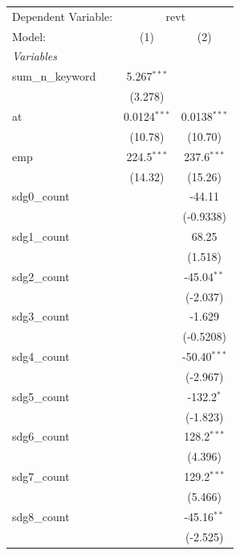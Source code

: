 
\begingroup
\centering
\begin{tabular}{lcc}
   \tabularnewline \midrule \midrule
   Dependent Variable: & \multicolumn{2}{c}{revt}\\
   Model:            & (1)            & (2)\\  
   \midrule
   \emph{Variables}\\
   sum\_n\_keyword   & 5.267$^{***}$  &   \\   
                     & (3.278)        &   \\   
   at                & 0.0124$^{***}$ & 0.0138$^{***}$\\   
                     & (10.78)        & (10.70)\\   
   emp               & 224.5$^{***}$  & 237.6$^{***}$\\   
                     & (14.32)        & (15.26)\\   
   sdg0\_count       &                & -44.11\\   
                     &                & (-0.9338)\\   
   sdg1\_count       &                & 68.25\\   
                     &                & (1.518)\\   
   sdg2\_count       &                & -45.04$^{**}$\\   
                     &                & (-2.037)\\   
   sdg3\_count       &                & -1.629\\   
                     &                & (-0.5208)\\   
   sdg4\_count       &                & -50.40$^{***}$\\   
                     &                & (-2.967)\\   
   sdg5\_count       &                & -132.2$^{*}$\\   
                     &                & (-1.823)\\   
   sdg6\_count       &                & 128.2$^{***}$\\   
                     &                & (4.396)\\   
   sdg7\_count       &                & 129.2$^{***}$\\   
                     &                & (5.466)\\   
   sdg8\_count       &                & -45.16$^{**}$\\   
                     &                & (-2.525)\\   

\end{tabular}
